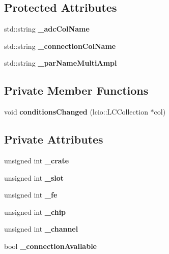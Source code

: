 \subsection*{Protected Attributes}
\begin{DoxyCompactItemize}
\item 
std\-::string {\bfseries \-\_\-adc\-Col\-Name}\label{classCALICE_1_1AppendMultiAmplitude_a90acd521e292e3f2bdd9ff56b4606f55}

\item 
std\-::string {\bfseries \-\_\-connection\-Col\-Name}\label{classCALICE_1_1AppendMultiAmplitude_a2902a95068d152cb11826aafe85f63bb}

\item 
std\-::string {\bfseries \-\_\-par\-Name\-Multi\-Ampl}\label{classCALICE_1_1AppendMultiAmplitude_a209412842c94a4ff6be9af6f7b41bf89}

\end{DoxyCompactItemize}
\subsection*{Private Member Functions}
\begin{DoxyCompactItemize}
\item 
void {\bfseries conditions\-Changed} (lcio\-::\-L\-C\-Collection $\ast$col)\label{classCALICE_1_1AppendMultiAmplitude_ae04c6bc30a5a1bfc4700c2575ae09a76}

\end{DoxyCompactItemize}
\subsection*{Private Attributes}
\begin{DoxyCompactItemize}
\item 
unsigned int {\bfseries \-\_\-crate}\label{classCALICE_1_1AppendMultiAmplitude_a4ecf8796bb93026dbf2d680b7dd70214}

\item 
unsigned int {\bfseries \-\_\-slot}\label{classCALICE_1_1AppendMultiAmplitude_a281f76046ded3a3aa7c5880242caf1bd}

\item 
unsigned int {\bfseries \-\_\-fe}\label{classCALICE_1_1AppendMultiAmplitude_a0b02671cdf754fc52ab8fa6348293431}

\item 
unsigned int {\bfseries \-\_\-chip}\label{classCALICE_1_1AppendMultiAmplitude_aa15678d8ba0780fad8c59e546087781d}

\item 
unsigned int {\bfseries \-\_\-channel}\label{classCALICE_1_1AppendMultiAmplitude_ab205e6309046702fb743238a594a14fd}

\item 
bool {\bfseries \-\_\-connection\-Available}\label{classCALICE_1_1AppendMultiAmplitude_af350bb41fd000d9968f9097cb91ad771}

\end{DoxyCompactItemize}


